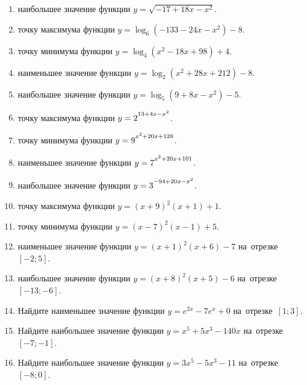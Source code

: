 \documentclass[a4paper,10pt]{article}
\begin{document}
\begin{enumerate}
\item {} наибольшее значение функции $y=\sqrt{-17+18x-x^2}$.

\item {} точку максимума функции $y=\log_6\left(-133-24x-x^2\right)-8$.

\item {} точку минимума функции $y=\log_4\left(x^2-18x+98\right)+4$.

\item {} наименьшее значение функции $y=\log_2\left(x^2+28x+212\right)-8$.

\item {} наибольшее значение функции $y=\log_5\left(9+8x-x^2\right)-5$.

\item {} точку максимума функции $y=2\strut^{13+4x-x^2}$.

\item {} точку минимума функции $y=9\strut^{x^2+20x+128}$.

\item {} наименьшее значение функции $y=7\strut^{x^2+20x+101}$.

\item {} наибольшее значение функции $y=3\strut^{-94+20x-x^2}$.

\item {} точку максимума функции $y=\left(x+9\right)^2\left(x+1\right)+1$.

\item {} точку минимума функции $y=\left(x-7\right)^2\left(x-1\right)+5$.

\item {} наименьшее значение функции $y=\left(x+1\right)^2\left(x+6\right)-7$ на~отрезке~$\left[-2;5\right]$.

\item {} наибольшее значение функции $y=\left(x+8\right)^2\left(x+5\right)-6$ на~отрезке~$\left[-13;-6\right]$.

\item Найдите наименьшее значение функции $y=e^{2x}-7e^x+0$ на~отрезке~$\left[1;3\right]$.

\item Найдите наибольшее значение функции $y=x^5+5x^3-140x$ на~отрезке~$\left[-7;-1\right]$.

\item Найдите наибольшее значение функции $y=3x^5-5x^3-11$ на~отрезке~$\left[-8;0\right]$.

\end{enumerate}
\end{document}
